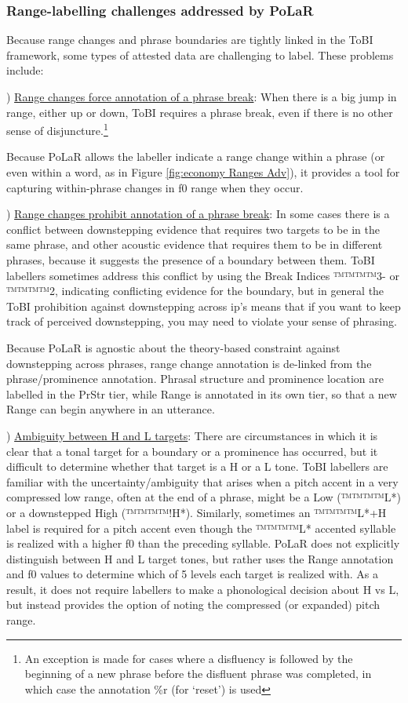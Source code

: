 \documentclass[11pt, twoside]{memoir}
\begin{document}
\subsubsection{Range-labelling challenges addressed by PoLaR}\label{sec:range-labelling-challenges}
Because range changes and phrase boundaries are tightly linked in the ToBI framework, some types of attested data are challenging to label.  These problems include:

) \uline{Range changes force annotation of a phrase break}: When there is a big jump in range, either up or down, ToBI requires a phrase break, even if there is no other sense of disjuncture.\footnote{An exception is made for cases where a disfluency is followed by the beginning of a new phrase before the disfluent phrase was completed, in which case the annotation \%r (for ‘reset’) is used}

Because PoLaR allows the labeller indicate a range change within a phrase (or even within a word, as in Figure \ref{fig:economy Ranges Adv}), it provides a tool for capturing within-phrase changes in f0 range when they occur. 

) \uline{Range changes prohibit annotation of a phrase break}: In some cases there is a conflict between downstepping evidence that requires two targets to be in the same phrase, and other acoustic evidence that requires them to be in different phrases, because it suggests the presence of a boundary between them. ToBI labellers sometimes address this conflict by using the Break Indices ™™™™{3-} or ™™™™{2}, indicating conflicting evidence for the boundary, but in general the ToBI prohibition against downstepping across ip’s means that if you want to keep track of perceived downstepping, you may need to violate your sense of phrasing.

Because PoLaR is agnostic about the theory-based constraint against downstepping across phrases, range change annotation is de-linked from the phrase\slash prominence annotation. Phrasal structure and prominence location are labelled in the PrStr tier, while Range is annotated in its own tier, so that a new Range can begin anywhere in an utterance.

) \uline{Ambiguity between H and L targets}:  There are circumstances in which it is clear that a tonal target for a boundary or a prominence has occurred, but it difficult to determine whether that target is a H or a L tone.  ToBI labellers are familiar with the uncertainty\slash ambiguity that arises when a pitch accent in a very compressed low range, often at the end of a phrase, might be a Low (™™™™{L*}) or a downstepped High (™™™™{!H*}).  Similarly, sometimes an ™™™™{L*+H} label is required for a pitch accent even though the ™™™™{L*} accented syllable is realized with a higher f0 than the preceding syllable.  PoLaR does not explicitly distinguish between H and L target tones, but rather uses the Range annotation and f0 values to determine which of 5 levels each target is realized with.  As a result, it does not require labellers to make a phonological decision about H vs L, but instead provides the option of noting the compressed (or expanded) pitch range.
\end{document}
